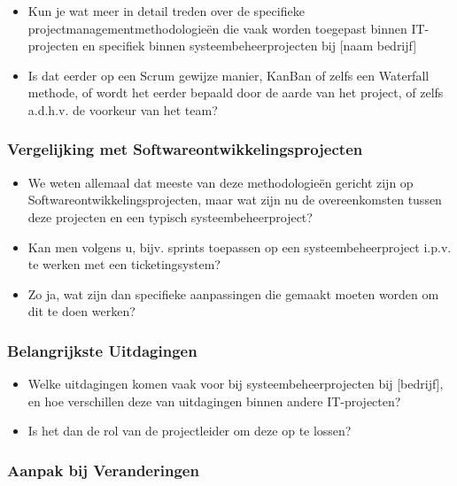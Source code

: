 \documentclass[dutch]{hogent-article}
\begin{document}
\begin{itemize}
    \item Kun je wat meer in detail treden over de specifieke projectmanagementmethodologieën die vaak worden toegepast binnen IT-projecten en specifiek binnen systeembeheerprojecten bij [naam bedrijf]
    \item Is dat eerder op een Scrum gewijze manier, KanBan of zelfs een Waterfall methode, of wordt het eerder bepaald door de aarde van het project, of zelfs a.d.h.v. de voorkeur van het team?
\end{itemize}

\subsubsection{Vergelijking met Softwareontwikkelingsprojecten}
\label{ssec:vergelijking-met-softwareontwikkelingsprojecten}

\begin{itemize}
    \item We weten allemaal dat meeste van deze methodologieën gericht zijn op Softwareontwikkelingsprojecten, maar wat zijn nu de overeenkomsten tussen deze projecten en een typisch systeembeheerproject?
    \item Kan men volgens u, bijv. sprints toepassen op een systeembeheerproject i.p.v. te werken met een ticketingsystem?
    \item Zo ja, wat zijn dan specifieke aanpassingen die gemaakt moeten worden om dit te doen werken?
\end{itemize}

\subsubsection{Belangrijkste Uitdagingen}
\label{ssec:belangrijkste-uitdagingen}

\begin{itemize}
    \item Welke uitdagingen komen vaak voor bij systeembeheerprojecten bij [bedrijf], en hoe verschillen deze van uitdagingen binnen andere IT-projecten?
    \item Is het dan de rol van de projectleider om deze op te lossen?
\end{itemize}

\subsubsection{Aanpak bij Veranderingen}
\label{ssec:aanpak-bij-veranderingen}
\end{document}

